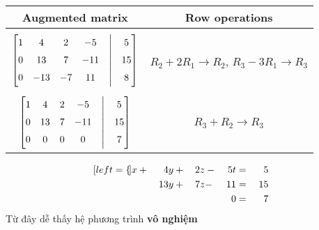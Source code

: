 \documentclass{article}
\begin{document}
\begin{center}
	\begin{table}[h]
		\centering
		\begin{tabular}{c|c}
			    	
			Augmented matrix & Row operations
			\\ 
			\hline    	 
			\\
			$\begin{bmatrix}
			1 & 4   & 2  & -5  & \Bigm| & 5  \\
			0 & 13  & 7  & -11 & \Bigm| & 15 \\
			0 & -13 & -7 & 11  & \Bigm| & 8  
			\end{bmatrix}$ & $R_2+2R_1 \to R_2$, $R_3 -3R_1 \to R_3$ \\ \\
			$\begin{bmatrix}
			1 & 4   & 2  & -5  & \Bigm| & 5  \\
			0 & 13  & 7  & -11 & \Bigm| & 15 \\
			0 & 0   & 0  & 0   & \Bigm| & 7  
			\end{bmatrix}$ & $R_3+ R_2 \to R_3$
		\end{tabular}
	\end{table}
\end{center}

\begin{alignat*}{4}[left = \empheqlbrace]
	x & {}+{} & 4y  & {}+{}  & 2z    & {}-{} & 5t   & {}={} & 5  \\
	  & {}{}  & 13y & {} +{} & 7z {} & -     & {}11 & {}={} & 15 \\
	  & {}{}  &     & {}{}   &       & {}{}  & 0    & {}={} & 7  
\end{alignat*}
Từ đây dễ thấy hệ phương trình \textbf{vô nghiệm}
\end{document}
